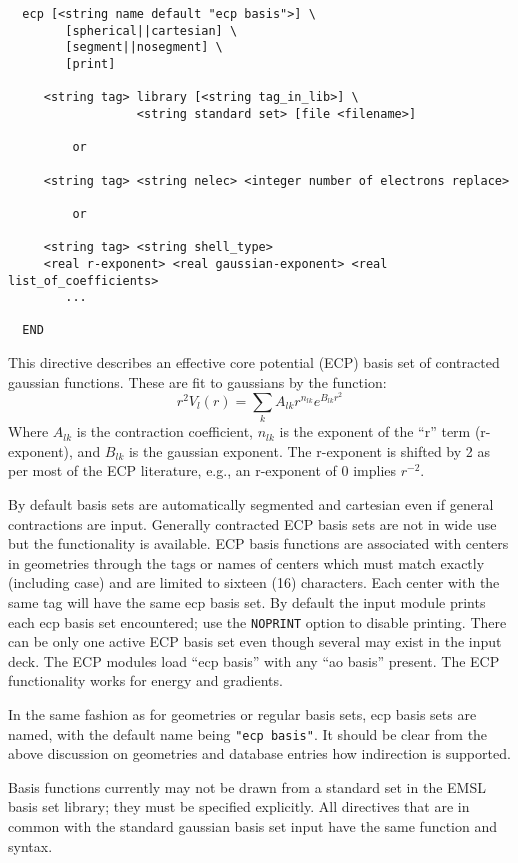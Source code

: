 \label{sec:ecp}
\begin{verbatim}
  ecp [<string name default "ecp basis">] \
        [spherical||cartesian] \
        [segment||nosegment] \
        [print]

     <string tag> library [<string tag_in_lib>] \
                  <string standard set> [file <filename>]

         or

     <string tag> <string nelec> <integer number of electrons replace>
 
         or

     <string tag> <string shell_type>
     <real r-exponent> <real gaussian-exponent> <real list_of_coefficients>
        ...
     
  END
\end{verbatim}    

This directive describes an effective core potential (ECP) basis set
of contracted gaussian functions.  These are fit to gaussians by the
function:
\[
r^2V_l(r) = \sum_{k} A_{lk} r^{n_{lk}} e^{B_{lk}r^{2}}
\]
Where $A_{lk}$ is the contraction coefficient, $n_{lk}$ is the
exponent of the ``r'' term (r-exponent), and $B_{lk}$ is the gaussian
exponent.  The r-exponent is shifted by 2 as per most of the ECP
literature, e.g., an r-exponent of 0 implies $r^{-2}$.

By default basis sets are automatically segmented and cartesian even
if general contractions are input.  Generally contracted ECP basis
sets are not in wide use but the functionality is available.  ECP
basis functions are associated with centers in geometries through the
tags or names of centers which must match exactly (including case) and
are limited to sixteen (16) characters.  Each center with the same tag
will have the same ecp basis set.  By default the input module prints
each ecp basis set encountered; use the \verb+NOPRINT+ option to
disable printing.  There can be only one active ECP basis set even
though several may exist in the input deck.  The ECP modules load
``ecp basis'' with any ``ao basis'' present.  The ECP functionality
works for energy and gradients.

In the same fashion as for geometries or regular basis sets, ecp basis
sets are named, with the default name being \verb+"ecp basis"+.  It
should be clear from the above discussion on geometries and database
entries how indirection is supported.

Basis functions currently may not be drawn from a standard set in the
EMSL basis set library; they must be specified explicitly.  All
directives that are in common with the standard gaussian basis set
input have the same function and syntax.  

